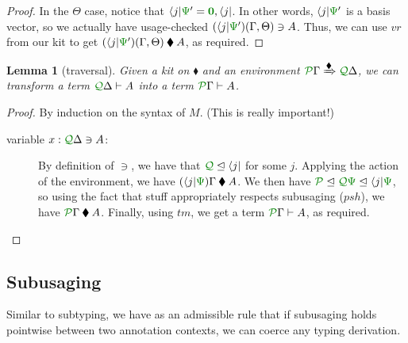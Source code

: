 \documentclass[submission,copyright,creativecommons]{eptcs}
\newtheorem{lemma}[theorem]{Lemma}
\newcommand{\kitrel}{\mathbin{\blacklozenge}}
\begin{document}
\begin{proof}
  In the $\Theta$ case, notice that
  $\langle j \rvert\rescomment\Psi' = \rescomment{\vct 0}, \langle j \rvert$.
  In other words, $\langle j \rvert\rescomment\Psi'$ is a basis vector, so we
  actually have usage-checked
  $(\langle j \rvert\rescomment\Psi')(\Gamma, \Theta) \ni A$.
  Thus, we can use $\mathit{vr}$ from our kit to get
  $(\langle j \rvert\rescomment\Psi')(\Gamma, \Theta) \kitrel A$, as required.
\end{proof}

\begin{lemma}[traversal]\label{lem:trav}
  Given a kit on $\kitrel$ and an environment
  $\ctx{\Gamma}{P} \subst{\kitrel} \ctx{\Delta}{Q}$, we can transform a term
  $\ctx{\Delta}{Q} \vdash A$ into a term $\ctx{\Gamma}{P} \vdash A$.
\end{lemma}
\begin{proof}
  By induction on the syntax of $M$. (This is really important!)
  \begin{description}
    \item[variable $x : \ctx{\Delta}{Q} \ni A$:]
      By definition of $\ni$, we have that $\resctx Q \subres \langle j \rvert$
      for some $j$.
      Applying the action of the environment, we have
      $(\langle j \rvert\rescomment\Psi)\Gamma \kitrel A$.
      We then have
      $\resctx P \subres \resctx Q\rescomment\Psi \subres \langle j \rvert\rescomment\Psi$,
      so using the fact that stuff appropriately respects subusaging
      ($\mathit{psh}$), we have $\ctx{\Gamma}{P} \kitrel A$.
      Finally, using $\mathit{tm}$, we get a term $\ctx{\Gamma}{P} \vdash A$, as
      required.
  \end{description}
\end{proof}

\subsection{Subusaging}

Similar to subtyping, we have as an admissible rule that if subusaging holds
pointwise between two annotation contexts, we can coerce any typing derivation.
\end{document}
